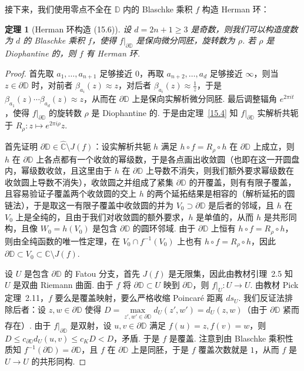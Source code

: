 \documentclass[11pt, a4paper, oneside]{ctexart}
\newtheorem{theorem}{定理}[section]
\newcommand{\C}{\mathbb{C}}
\newcommand{\D}{\mathbb{D}}
\begin{document}
    接下来，我们使用零点不全在 $\D$ 内的 Blaschke 乘积 $f$ 构造 Herman 环：
    \begin{theorem}[Herman 环构造 (15.6)]
        设 $d=2n+1\geq 3$ 是奇数，则我们可以构造度数为 $d$ 的 Blaschke 乘积 $f$，使得 $f|_{\partial\D}$ 是保向微分同胚，旋转数为 $\rho$. 若 $\rho$ 是 Diophantine 的，则 $f$ 有 Herman 环.
    \end{theorem}
    \begin{proof}
        首先取 $a_1,\ldots,a_{n+1}$ 足够接近 $0$，再取 $a_{n+2},\ldots,a_d$ 足够接近 $\infty$，则当 $z\in\partial\D$ 时，对前者 $\beta_{a_i}(z)\approx z$，对后者 $\beta_{a_i}(z)\approx\frac{1}{z}$，于是 $\beta_{a_1}(z)\cdots\beta_{a_d}(z)\approx z$，从而在 $\partial\D$ 上是保向实解析微分同胚. 最后调整辐角 $e^{2\pi it}$，使得 $f|_{\partial\D}$ 的旋转数 $\rho$ 是 Diophantine 的. 于是由定理~\ref{15.4} 知 $f|_{\partial\D}$ 实解析共轭于 $R_{\rho}:z\mapsto e^{2\pi i\rho}z$.
        
        首先证明 $\partial\D\in\hat{\C}\setminus J(f)$：设实解析共轭 $h$ 满足 $h\circ f=R_{\rho}\circ h$ 在 $\partial\D$ 上成立，则 $h$ 在 $\partial\D$ 上各点都有一个收敛的幂级数，于是各点画出收敛圆（也即在这一开圆盘内，幂级数收敛，且这里由于 $h$ 在 $\partial\D$ 上导数不消失，则我们额外要求幂级数在收敛圆上导数不消失），收敛圆之并组成了紧集 $\partial\D$ 的开覆盖，则有有限子覆盖，且容易验证子覆盖两个收敛圆的交上 $h$ 的两个延拓结果是相容的（解析延拓的圆链法），于是取这一有限子覆盖中收敛圆的并为 $V_0\supset \partial\D$ 是后者的邻域，且 $h$ 在 $V_0$ 上是全纯的，且由于我们对收敛圆的额外要求，$h$ 是单值的，从而 $h$ 是共形同构，且像 $W_0=h(V_0)$ 是包含 $\partial\D$ 的圆环邻域. 由于 $\partial\D$ 上恒有 $h\circ f=R_{\rho}\circ h$，则由全纯函数的唯一性定理，在 $V_0\cap f^{-1}(V_0)$ 上也有 $h\circ f=R_{\rho}\circ h$，因此 $\partial\D\subset V_0\subset \hat{\C}\setminus J(f)$.
        
        设 $U$ 是包含 $\partial\D$ 的 Fatou 分支，首先 $J(f)$ 是无限集，因此由教材引理~2.5 知 $U$ 是双曲 Riemann 曲面. 由于 $f$ 将 $\partial\D\subset U$ 映到 $\partial\D$，则 $f|_U:U\to U$. 由教材 Pick 定理~2.11，$f$ 要么是覆盖映射，要么严格收缩 Poincaré 距离 $ds_U$. 我们反证法排除后者：设 $z,w\in \partial\D$ 使得 $D=\max\limits_{z',w'\in\partial\D}d_U(z',w')=d_U(z,w)$（由于 $\partial\D$ 紧而存在）. 由于 $f|_{\partial\D}$ 是双射，设 $u,v\in\partial\D$ 满足 $f(u)=z,f(v)=w$，则 $D\leq c_{\partial\D}d_U(u,v)\leq c_K D<D$，矛盾. 于是 $f$ 是覆盖. 注意到由 Blaschke 乘积性质知 $f^{-1}(\partial\D)=\partial\D$，且 $f$ 在 $\partial\D$ 上是同胚，于是 $f$ 覆盖次数就是 $1$，从而 $f$ 是 $U\to U$ 的共形同构.


\end{proof}
\end{document}
